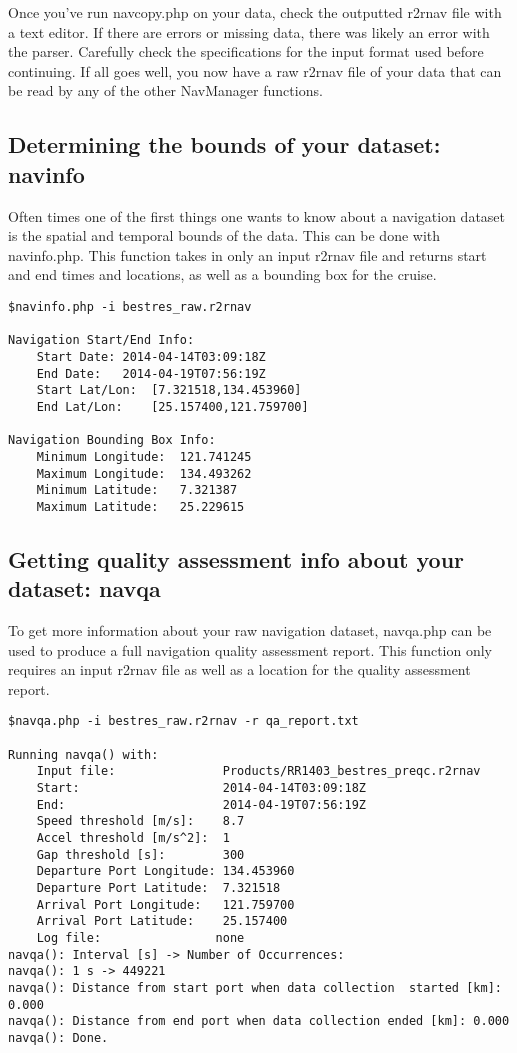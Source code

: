 \documentclass{article}
\begin{document}
Once you've run navcopy.php on your data, check the outputted r2rnav file with a text editor.  If there are errors or missing data, there was likely an error with the parser.  Carefully check the specifications for the input format used before continuing.  If all goes well, you now have a raw r2rnav file of your data that can be read by any of the other NavManager functions.
		
		\subsection{Determining the bounds of your dataset: navinfo}
		
Often times one of the first things one wants to know about a navigation dataset is the spatial and temporal bounds of the data.  This can be done with navinfo.php.  This function takes in only an input r2rnav file and returns start and end times and locations, as well as a bounding box for the cruise.

		\begin{lstlisting}
$navinfo.php -i bestres_raw.r2rnav

Navigation Start/End Info:
	Start Date:	2014-04-14T03:09:18Z
	End Date:	2014-04-19T07:56:19Z
	Start Lat/Lon:	[7.321518,134.453960]
	End Lat/Lon:	[25.157400,121.759700]

Navigation Bounding Box Info:
	Minimum Longitude:	121.741245
	Maximum Longitude:	134.493262
	Minimum Latitude:	7.321387
	Maximum Latitude:	25.229615
		\end{lstlisting}
		
		\subsection{Getting quality assessment info about your dataset: navqa}
		
To get more information about your raw navigation dataset, navqa.php can be used to produce a full navigation quality assessment report.  This function only requires an input r2rnav file as well as a location for the quality assessment report.

		\begin{lstlisting}
$navqa.php -i bestres_raw.r2rnav -r qa_report.txt

Running navqa() with:
	Input file:               Products/RR1403_bestres_preqc.r2rnav
	Start:                    2014-04-14T03:09:18Z
	End:                      2014-04-19T07:56:19Z
	Speed threshold [m/s]:    8.7
	Accel threshold [m/s^2]:  1
	Gap threshold [s]:        300
	Departure Port Longitude: 134.453960
	Departure Port Latitude:  7.321518
	Arrival Port Longitude:   121.759700
	Arrival Port Latitude:    25.157400
	Log file:                none
navqa(): Interval [s] -> Number of Occurrences: 
navqa(): 1 s -> 449221
navqa(): Distance from start port when data collection  started [km]: 0.000
navqa(): Distance from end port when data collection ended [km]: 0.000
navqa(): Done.
		\end{lstlisting}
		
\end{document}
